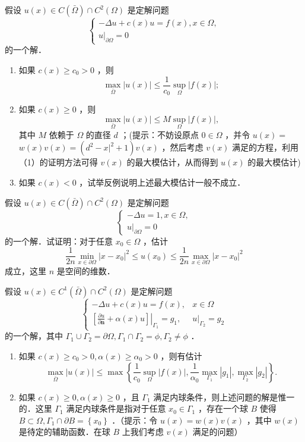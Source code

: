 \documentclass{mynote}
\begin{document}
\begin{exercise}
    假设 $u(x) \in C(\bar{\Omega}) \cap C^2(\Omega)$ 是定解问题
$$
\left\{\begin{array}{l}
-\Delta u+c(x) u=f(x), x \in \Omega, \\
\left.u\right|_{\partial \Omega}=0
\end{array}\right.
$$
的一个解．
\begin{enumerate}
    \item 如果 $c(x) \geq c_0>0$ ，则
$$
\max _{\bar{\Omega}}|u(x)| \leq \frac{1}{c_0} \sup _{\Omega}|f(x)| ;
$$
\item 如果 $c(x) \geq 0$ ，则
$$
\max _{\bar{\Omega}}|u(x)| \leq M \sup _{\Omega}|f(x)|,
$$
其中 $M$ 依赖于 $\Omega$ 的直径 $d$ ；(提示：不妨设原点 $0 \in \Omega$ ，并令 $u(x)=$ $w(x) v(x)=\left(d^2-x|^2+1\right) v(x)$ ，然后考虑 $v(x)$ 满足的方程，利用（1）的证明方法可得 $v(x)$ 的最大模估计，从而得到 $u(x)$ 的最大模估计)
\item 如果 $c(x)<0$ ，试举反例说明上述最大模估计一般不成立．
\end{enumerate}
\end{exercise}


\begin{exercise}
    假设 $u(x) \in C(\bar{\Omega}) \cap C^2(\Omega)$ 是定解问题
$$
\left\{\begin{array}{l}
-\Delta u=1, x \in \Omega, \\
\left.u\right|_{\partial \Omega}=0
\end{array}\right.
$$
的一个解．试证明：对于任意 $x_0 \in \Omega$ ，估计
$$
\frac{1}{2 n} \min _{x \in \partial \Omega}\left|x-x_0\right|^2 \leq u\left(x_0\right) \leq \frac{1}{2 n} \max _{x \in \partial \Omega}\left|x-x_0\right|^2
$$
成立，这里 $n$ 是空间的维数．
\end{exercise}

\begin{exercise}
    假设 $u(x) \in C^1(\bar{\Omega}) \cap C^2(\Omega)$ 是定解问题
$$
\begin{cases}-\Delta u+c(x) u=f(x), & x \in \Omega \\ {\left.\left[\frac{\partial u}{\partial \boldsymbol{n}}+\alpha(x) u\right]\right|_{\Gamma_1}=g_1,} & \left.u\right|_{\Gamma_2}=g_2\end{cases}
$$
的一个解，其中 $\Gamma_1 \cup \Gamma_2=\partial \Omega, \Gamma_1 \cap \Gamma_2=\phi, \Gamma_2 \neq \phi$ ．
\begin{enumerate}
    \item 如果 $c(x) \geq c_0>0, \alpha(x) \geq \alpha_0>0$ ，则有估计
$$
\max _{\bar{\Omega}}|u(x)| \leq \max \left\{\frac{1}{c_0} \sup _{\Omega}|f(x)|, \frac{1}{\alpha_0} \max _{\Gamma_1}\left|g_1\right|, \max _{\Gamma_2}\left|g_2\right|\right\} .
$$
    \item 如果 $c(x) \geq 0, \alpha(x) \geq 0$ ，且 $\Gamma_1$ 满足内球条件，则上述问题的解是惟一的．这里 $\Gamma_1$ 满足内球条件是指对于任意 $x_0 \in \Gamma_1$ ，存在一个球 $B$ 使得 $B \subset \Omega, \Gamma_1 \cap \partial B=\left\{x_0\right\}$ ．（提示：令 $u(x)=w(x) v(x)$ ，其中 $w(x)$ 是待定的辅助函数．在球 $B$ 上我们考虑 $v(x)$ 满足的问题）
\end{enumerate}
\end{exercise}
\end{document}
